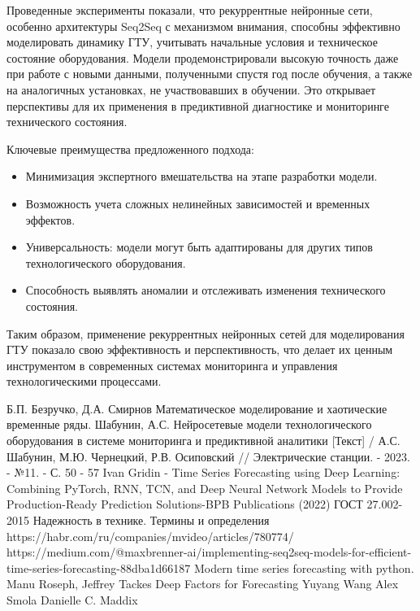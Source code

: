 \documentclass[12pt,a4paper]{article}
\begin{document}
Проведенные эксперименты показали, что рекуррентные нейронные сети, особенно архитектуры Seq2Seq с механизмом внимания, способны эффективно моделировать динамику ГТУ, учитывать начальные условия и техническое состояние оборудования. Модели продемонстрировали высокую точность даже при работе с новыми данными, полученными спустя год после обучения, а также на аналогичных установках, не участвовавших в обучении. Это открывает перспективы для их применения в предиктивной диагностике и мониторинге технического состояния.

Ключевые преимущества предложенного подхода:
\begin{itemize}
	\item Минимизация экспертного вмешательства на этапе разработки модели.
	\item Возможность учета сложных нелинейных зависимостей и временных эффектов.
	\item Универсальность: модели могут быть адаптированы для других типов технологического оборудования.
	\item Способность выявлять аномалии и отслеживать изменения технического состояния.
\end{itemize}

Таким образом, применение рекуррентных нейронных сетей для моделирования ГТУ показало свою эффективность и перспективность, что делает их ценным инструментом в современных системах мониторинга и управления технологическими процессами.




%

\newpage
\begin{thebibliography}{}
	 Б.П. Безручко, Д.А. Смирнов Математическое моделирование и хаотические временные ряды.
	 Шабунин, А.С. Нейросетевые модели технологического оборудования в системе мониторинга и предиктивной аналитики [Текст] / А.С. Шабунин, М.Ю. Чернецкий, Р.В. Осиповский // Электрические станции. - 2023. - №11. - С. 50 - 57
	 Ivan Gridin - Time Series Forecasting using Deep Learning: Combining PyTorch, RNN, TCN, and Deep Neural Network Models to Provide Production-Ready Prediction Solutions-BPB Publications (2022)
	 ГОСТ 27.002-2015 Надежность в технике. Термины и определения
	 https://habr.com/ru/companies/mvideo/articles/780774/
	 https://medium.com/@maxbrenner-ai/implementing-seq2seq-models-for-efficient-time-series-forecasting-88dba1d66187
	 Modern time series forecasting with python. Manu Roseph, Jeffrey Tackes
	 Deep Factors for Forecasting Yuyang Wang Alex Smola Danielle C. Maddix 
\end{thebibliography}
\end{document}
